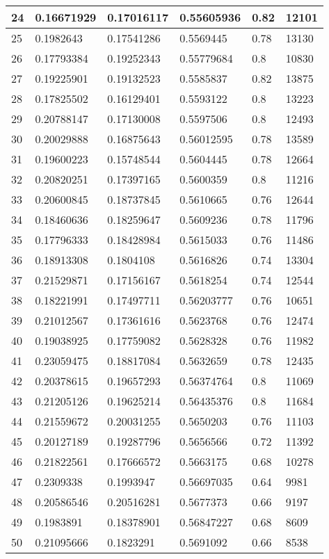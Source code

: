 \begin{longtable}{|l|l|l|l|l|l|}
24 & 0.16671929 & 0.17016117 & 0.55605936 & 0.82 & 12101 \\ \hline 
25 & 0.1982643 & 0.17541286 & 0.5569445 & 0.78 & 13130 \\ \hline 
26 & 0.17793384 & 0.19252343 & 0.55779684 & 0.8 & 10830 \\ \hline 
27 & 0.19225901 & 0.19132523 & 0.5585837 & 0.82 & 13875 \\ \hline 
28 & 0.17825502 & 0.16129401 & 0.5593122 & 0.8 & 13223 \\ \hline 
29 & 0.20788147 & 0.17130008 & 0.5597506 & 0.8 & 12493 \\ \hline 
30 & 0.20029888 & 0.16875643 & 0.56012595 & 0.78 & 13589 \\ \hline 
31 & 0.19600223 & 0.15748544 & 0.5604445 & 0.78 & 12664 \\ \hline 
32 & 0.20820251 & 0.17397165 & 0.5600359 & 0.8 & 11216 \\ \hline 
33 & 0.20600845 & 0.18737845 & 0.5610665 & 0.76 & 12644 \\ \hline 
34 & 0.18460636 & 0.18259647 & 0.5609236 & 0.78 & 11796 \\ \hline 
35 & 0.17796333 & 0.18428984 & 0.5615033 & 0.76 & 11486 \\ \hline 
36 & 0.18913308 & 0.1804108 & 0.5616826 & 0.74 & 13304 \\ \hline 
37 & 0.21529871 & 0.17156167 & 0.5618254 & 0.74 & 12544 \\ \hline 
38 & 0.18221991 & 0.17497711 & 0.56203777 & 0.76 & 10651 \\ \hline 
39 & 0.21012567 & 0.17361616 & 0.5623768 & 0.76 & 12474 \\ \hline 
40 & 0.19038925 & 0.17759082 & 0.5628328 & 0.76 & 11982 \\ \hline 
41 & 0.23059475 & 0.18817084 & 0.5632659 & 0.78 & 12435 \\ \hline 
42 & 0.20378615 & 0.19657293 & 0.56374764 & 0.8 & 11069 \\ \hline 
43 & 0.21205126 & 0.19625214 & 0.56435376 & 0.8 & 11684 \\ \hline 
44 & 0.21559672 & 0.20031255 & 0.5650203 & 0.76 & 11103 \\ \hline 
45 & 0.20127189 & 0.19287796 & 0.5656566 & 0.72 & 11392 \\ \hline 
46 & 0.21822561 & 0.17666572 & 0.5663175 & 0.68 & 10278 \\ \hline 
47 & 0.2309338 & 0.1993947 & 0.56697035 & 0.64 & 9981 \\ \hline 
48 & 0.20586546 & 0.20516281 & 0.5677373 & 0.66 & 9197 \\ \hline 
49 & 0.1983891 & 0.18378901 & 0.56847227 & 0.68 & 8609 \\ \hline 
50 & 0.21095666 & 0.1823291 & 0.5691092 & 0.66 & 8538 \\ \hline 
\end{longtable}